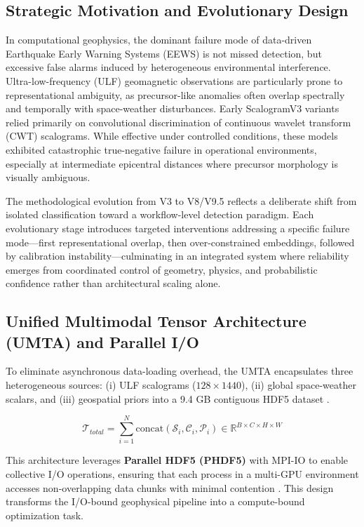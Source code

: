 \documentclass[a4paper,fleqn]{cas-sc}
\begin{document}
\subsection{Strategic Motivation and Evolutionary Design}

In computational geophysics, the dominant failure mode of data-driven Earthquake Early Warning Systems (EEWS) is not missed detection, but excessive false alarms induced by heterogeneous environmental interference. Ultra-low-frequency (ULF) geomagnetic observations are particularly prone to representational ambiguity, as precursor-like anomalies often overlap spectrally and temporally with space-weather disturbances. Early ScalogramV3 variants relied primarily on convolutional discrimination of continuous wavelet transform (CWT) scalograms. While effective under controlled conditions, these models exhibited catastrophic true-negative failure in operational environments, especially at intermediate epicentral distances where precursor morphology is visually ambiguous.

The methodological evolution from V3 to V8/V9.5 reflects a deliberate shift from isolated classification toward a workflow-level detection paradigm. Each evolutionary stage introduces targeted interventions addressing a specific failure mode—first representational overlap, then over-constrained embeddings, followed by calibration instability—culminating in an integrated system where reliability emerges from coordinated control of geometry, physics, and probabilistic confidence rather than architectural scaling alone.

\subsection{Unified Multimodal Tensor Architecture (UMTA) and Parallel I/O}
To eliminate asynchronous data-loading overhead, the UMTA encapsulates three heterogeneous sources: (i) ULF scalograms ($128 \times 1440$), (ii) global space-weather scalars, and (iii) geospatial priors into a 9.4 GB contiguous HDF5 dataset \cite{Ganguly2024JPDC,Strem2025RESS}. 

\begin{equation}
\mathcal{T}_{total} = \sum_{i=1}^{N} \text{concat}(\mathcal{S}_{i}, \mathcal{C}_{i}, \mathcal{P}_{i}) \in \mathbb{R}^{B \times C \times H \times W}
\end{equation}

This architecture leverages \textbf{Parallel HDF5 (PHDF5)} with MPI-IO to enable collective I/O operations, ensuring that each process in a multi-GPU environment accesses non-overlapping data chunks with minimal contention \cite{Ouyang2023Parallel,Park2025JASA}. This design transforms the I/O-bound geophysical pipeline into a compute-bound optimization task.
\end{document}

